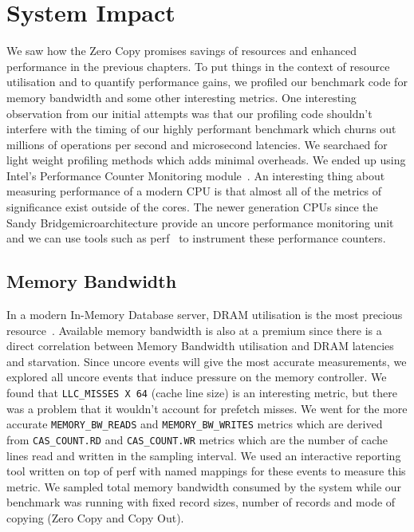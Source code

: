
\chapter{System Impact}
\label{chap:impact}

We saw how the Zero Copy promises savings of resources and enhanced performance 
in the previous chapters. To put things in the context of resource utilisation and
 to quantify performance gains, we profiled our benchmark code for memory bandwidth 
 and some other interesting metrics. One interesting observation from our initial 
 attempts was that our profiling code shouldn't interfere with the timing of our highly performant 
 benchmark which churns out millions of operations per second and microsecond latencies. 
 We searchaed for light weight profiling methods which adds minimal overheads.
 We ended up using Intel\textregistered's Performance Counter Monitoring module~\cite{intelpcm}. 
 An interesting thing about measuring performance 
 of a modern CPU is that almost all of the metrics of significance exist outside of the cores.
 The newer generation CPUs since the Sandy Bridge\textregistered microarchitecture provide an uncore performance 
 monitoring unit and we can use tools such as perf~\cite{perftool} to instrument these performance 
 counters. 

\section{Memory Bandwidth}
In a modern In-Memory Database server, DRAM utilisation is the most precious resource~\cite{ramcloudfast}. 
 Available memory bandwidth is also at a premium since there is a direct correlation between Memory Bandwidth
 utilisation and DRAM latencies and starvation. Since uncore events will give the most accurate measurements,
 we explored all uncore events that induce pressure on the memory controller. We found that 
\texttt{LLC\_MISSES X 64} (cache line size) is an interesting metric, but there was a problem that it wouldn't account for prefetch 
 misses. We went for the more accurate \texttt{MEMORY\_BW\_READS} and \texttt{MEMORY\_BW\_WRITES} metrics which are derived from 
 \texttt{CAS\_COUNT.RD} and \texttt{CAS\_COUNT.WR} metrics which are the number of cache lines read and written in the sampling 
 interval. We used an interactive reporting tool written on top of perf with named mappings for these events
 to measure this metric. We sampled total memory bandwidth consumed by the system while our benchmark 
 was running with fixed record sizes, number of records and mode of copying (Zero Copy and Copy Out).

